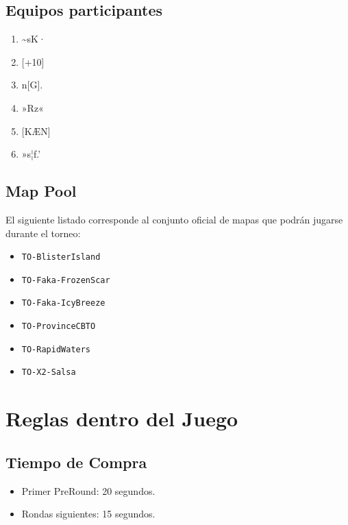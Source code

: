 \documentclass[a4paper, 11pt]{article}
\begin{document}
    \subsection{Equipos participantes}

    \begin{enumerate}
        \item {\textasciitilde sK·}
        \item {[+10]}
        \item {n[G].}
        \item {»Rz«}
        \item {[KÆN]}
        \item {»s¦ƒ.'}
    \end{enumerate}

    \subsection{Map Pool}

    El siguiente listado corresponde al conjunto oficial de mapas que podrán jugarse durante el torneo:

    \begin{itemize}
        \item \texttt{TO-BlisterIsland}
        \item \texttt{TO-Faka-FrozenScar}
        \item \texttt{TO-Faka-IcyBreeze}
        \item \texttt{TO-ProvinceCBTO}
        \item \texttt{TO-RapidWaters}
        \item \texttt{TO-X2-Salsa}
    \end{itemize}

    \clearpage

    \section{Reglas dentro del Juego}

    \subsection{Tiempo de Compra}

    \begin{itemize}
        \item Primer PreRound: 20 segundos.
        \item Rondas siguientes: 15 segundos.
    \end{itemize}
\end{document}
